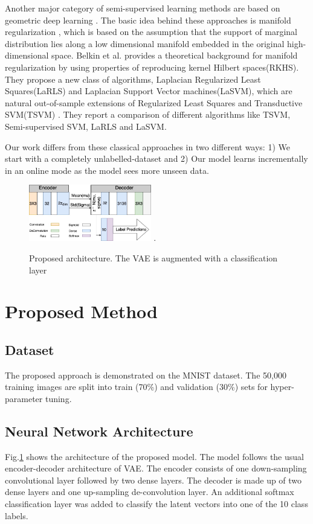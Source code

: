 \documentclass[runningheads]{llncs}
\begin{document}
Another major category of semi-supervised learning methods are based on geometric deep learning \cite{li_2018}\cite{mikhail_2006}\cite{ding_2018}.
The basic idea behind these approaches is manifold regularization \cite{mikhail_2006} \cite{ding_2018}, which is based on the assumption that the support of marginal distribution lies along a low dimensional manifold embedded in the original high-dimensional space.
Belkin et al. \cite{mikhail_2006} provides a theoretical background for manifold regularization by using properties of reproducing kernel Hilbert spaces(RKHS).
They propose a new class of algorithms, Laplacian Regularized Least Squares(LaRLS) and Laplacian Support Vector machines(LaSVM), which are natural out-of-sample extensions of Regularized Least Squares and Transductive SVM(TSVM) \cite{joachims_1999}.
They report a comparison of different algorithms like TSVM, Semi-supervised SVM\cite{bennett_1999}, LaRLS and LaSVM.

Our work differs from these classical approaches in two different ways: 1) We start with a completely unlabelled-dataset and 2) Our model learns incrementally in an online mode as the model sees more unseen data.

\begin{figure}[!t]
\centering
\includegraphics[width=2.1in]{images/var_arch_v5.jpg}
\DeclareGraphicsExtensions.
\caption{Proposed architecture. The VAE is augmented with a classification layer}
\label{vae_architecture}
\end{figure}
\section{Proposed Method}

\subsection{Dataset}
The proposed approach is demonstrated on the MNIST dataset.
The 50,000 training images are split into train (70\%) and validation (30\%) sets for hyper-parameter tuning.

\subsection{Neural Network Architecture}
Fig.\ref{vae_architecture} shows the architecture of the proposed model.
The model follows the usual encoder-decoder architecture of VAE.
The encoder consists of one down-sampling convolutional layer followed by two dense layers.
The decoder is made up of two dense layers and one up-sampling de-convolution layer.
An additional softmax classification layer was added to classify the latent vectors into one of the 10 class labels.
\end{document}
